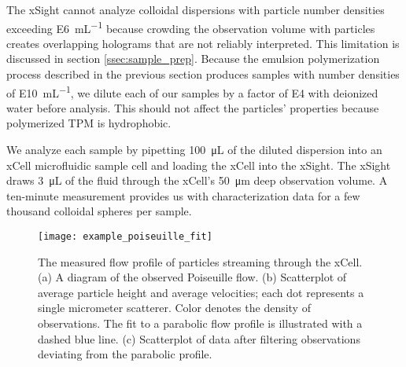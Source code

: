 The xSight cannot analyze colloidal dispersions with particle number densities exceeding
\SI{E6}{\milli\liter^{-1}} because crowding the observation volume with
particles creates overlapping holograms that are not reliably interpreted.
This limitation is discussed in section \ref{ssec:sample_prep}.
Because the emulsion polymerization process described in the previous section
produces samples with number densities of \SI{E10}{\milli\liter^{-1}},
we dilute each of our samples by a factor of \SI{E4}{} with
deionized water before analysis. This should not affect the particles'
properties because polymerized TPM is hydrophobic.

We analyze each sample by pipetting \SI{100}{\micro\liter} of the diluted
dispersion into an xCell microfluidic sample cell and loading the xCell into the xSight.
The xSight draws \SI{3}{\micro\liter} of the fluid through
the xCell's \SI{50}{\um} deep observation volume. A ten-minute measurement provides us with
characterization data for a few thousand colloidal spheres per sample.

\begin{figure}
    \centering
    \texttt{[image: example\_poiseuille\_fit]}
    \caption{The measured flow profile of particles streaming through the xCell.
      (a)  A diagram of the observed Poiseuille flow.\protect\footnotemark 
      (b) Scatterplot of average particle height and average velocities; each
      dot represents a single micrometer scatterer. Color denotes the density of
      observations. The fit to a parabolic flow profile is illustrated with a dashed
      blue line. (c) Scatterplot of data after filtering observations deviating
      from the parabolic profile.}
    \label{fig:flow_prof}
\end{figure}



